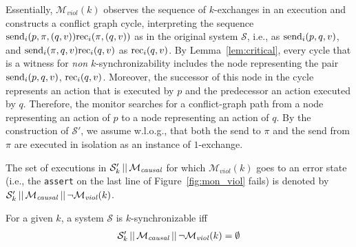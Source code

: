 Essentially, $\mathcal{M}_{\mathit{viol}}(k)$ observes the sequence of $k$-exchanges in an execution and constructs a conflict graph cycle, interpreting the sequence $\mathrm{send}_{i}({p,\pi,(q,v)})\mathrm{rec}_{i}({\pi,(q,v)})$ as in the original system $\mathcal{S}$, i.e., as $\mathrm{send}_{i}({p,q,v})$, and $\mathrm{send}_{i}({\pi,q,v})\mathrm{rec}_{i}({q,v})$ as $\mathrm{rec}_{i}({q,v})$. 
By Lemma~\ref{lem:critical}, every cycle that is a witness for \emph{non} $k$-synchronizability includes the node representing the pair $\mathrm{send}_{i}({p,q,v})$, $\mathrm{rec}_{i}({q,v})$. Moreover, the successor of this node in the cycle represents an action that is executed by $p$ and the predecessor an action executed by $q$. Therefore, the monitor searches for a conflict-graph path from a node representing an action of $p$ to a node representing an action of $q$. By the construction of $\mathcal{S'}$, we assume w.l.o.g., that both the send to $\pi$ and the send from $\pi$ are executed in isolation as an instance of $1$-exchange.



The set of executions in $\mathcal{S}_k' \,||\,\mathcal{M}_{\mathit{causal}}$ for which $\mathcal{M}_{\mathit{viol}}(k)$ goes to an error state (i.e., the {\tt assert} on the last line of Figure~\ref{fig:mon_viol} fails) is denoted by $\mathcal{S}_k' \,||\,\mathcal{M}_{\mathit{causal}}\,||\, \neg \mathcal{M}_{\mathit{viol}}(k)$.

\begin{theorem}\label{th:main-verif}
For a given $k$, a system $\mathcal{S}$ is $k$-synchronizable iff 
\begin{align*}
\mathcal{S}_k' \,||\,\mathcal{M}_{\mathit{causal}}\,||\, \neg \mathcal{M}_{\mathit{viol}}(k)=\emptyset
\end{align*}
\end{theorem}








